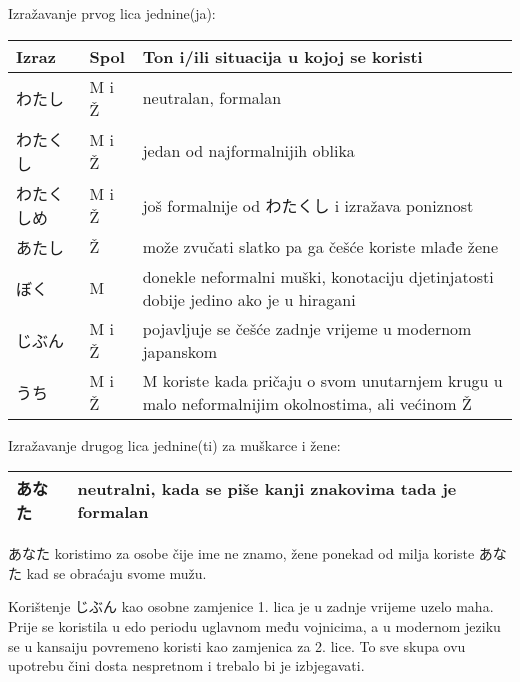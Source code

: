 
\author{Tomislav Mamić, Željka Ludošan, Mihaela Bošnjak}
\usepackage{graphicx}
\usepackage{caption}


	
		
	Izražavanje prvog lica jednine(ja):
	\begin{table}[!h]	
	\begin{tabular}{l l p{400pt}}
		\toprule[2pt]
		Izraz		&Spol	& Ton i/ili situacija u kojoj se koristi\\
		\midrule
		わたし		&M i Ž	&neutralan, formalan\\
		わたくし	&M i Ž	&jedan od najformalnijih oblika\\
		わたくしめ	&M i Ž	&još formalnije od わたくし i izražava poniznost\\
		あたし		&Ž	&može zvučati slatko pa ga češće koriste mlađe žene\\
		ぼく		&M	&donekle neformalni muški, konotaciju djetinjatosti dobije jedino ako je u hiragani\\
		じぶん		&M i Ž	&pojavljuje se češće zadnje vrijeme u modernom japanskom\\
		うち		&M i Ž	&M koriste kada pričaju o svom unutarnjem krugu u malo neformalnijim okolnostima, ali većinom Ž\\
		\bottomrule[2pt]
	\end{tabular}
	\end{table}

	
	Izražavanje drugog lica jednine(ti) za muškarce i žene:
	\begin{table}[!h]
	\begin{tabular}{l l}
		\toprule[2pt]
		あなた&neutralni, kada se piše kanji znakovima tada je formalan\\
		\bottomrule[2pt]
	\end{tabular}
	\end{table}
		
	あなた koristimo za osobe čije ime ne znamo, žene ponekad od milja koriste あなた kad se obraćaju svome mužu.
	
	Korištenje じぶん kao osobne zamjenice 1. lica je u zadnje vrijeme uzelo maha. Prije se koristila u edo periodu uglavnom među vojnicima, a u modernom jeziku se u kansaiju povremeno koristi kao zamjenica za 2. lice. To sve skupa ovu upotrebu čini dosta nespretnom i trebalo bi je izbjegavati.
	
